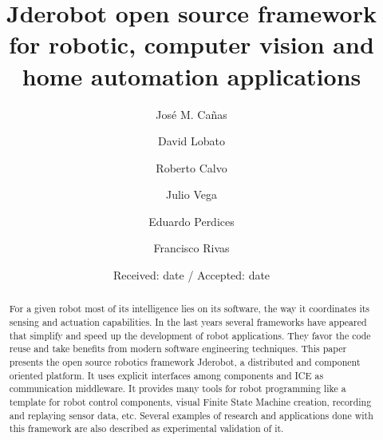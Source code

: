 \documentclass[twocolumn]{svjour3}          %
\begin{document}
\title{Jderobot open source framework for robotic, computer vision and home automation applications
}


\author{Jos\'e M. Ca\~nas \and David Lobato \and Roberto Calvo \and Julio Vega \and Eduardo Perdices \and Francisco Rivas}



\date{Received: date / Accepted: date}


\maketitle

\begin{abstract}
For a given robot most of its intelligence lies on its software, the way it coordinates its sensing and actuation capabilities. In the last years several frameworks have appeared that simplify and speed up the development of robot applications. They favor the code reuse and take benefits from modern software engineering techniques. This paper presents the open source robotics framework Jderobot, a distributed and component oriented platform. It uses explicit interfaces among components and ICE as communication middleware. It provides many tools for robot programming like a template for robot control components, visual Finite State Machine creation, recording and replaying sensor data, etc. Several examples of research and applications done with this framework are also described as experimental validation of it.
\end{abstract}
\end{document}
